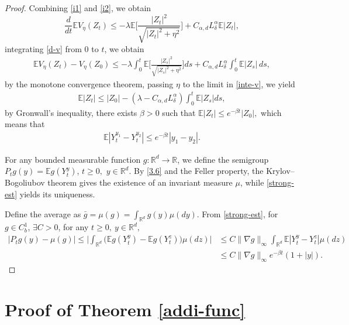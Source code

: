 \documentclass[11pt,reqno]{amsart}
\numberwithin{equation}{section}
\newcommand{\R}{\mathbb{R}}
\begin{document}
\begin{proof}
	
	Combining \eqref{i1} and \eqref{i2}, we obtain
	\begin{equation}\label{d-v}
		\frac{d}{dt}\mathbb E V_\eta(Z_t)
		\leq-\lambda \mathbb E\bigg[\frac{|Z_t|^2}{\sqrt{|Z_t|^2+\eta^2}}\bigg]
		+C_{\alpha,d}L_\delta^{\alpha}\mathbb E|Z_t|,
	\end{equation}
	integrating \eqref{d-v} from $0$ to $t$, we obtain
	\begin{align}\label{inte-v}
	\mathbb E V_\eta(Z_t)- V_\eta(Z_0)\leq-\lambda\int_0^t \mathbb E\bigg[\frac{|Z_s|^2}{\sqrt{|Z_s|^2+\eta^2}}\bigg]ds+
	C_{\alpha,d}L_\delta^{\alpha}\int_0^t\mathbb E|Z_s|\,ds,
	\end{align}
by the monotone convergence theorem, passing $\eta$ to the limit in \eqref{inte-v}, we yield
\begin{align*}
\mathbb E|Z_t|	\leq |Z_0|-\left(	\lambda-C_{\alpha,d}L_\delta^{\alpha}	\right)\int_{0}^{t}	\mathbb E|Z_s|ds,
\end{align*}
	by Gronwall's inequality, there exists $\beta>0$ such that
$
	\mathbb E|Z_t|\leq e^{-\beta t}|Z_0|,
$
	which means that
	\begin{align*}
	\mathbb E|Y_t^{y_1}-Y_t^{y_2}|\leq e^{-\beta t}|y_1-y_2|.
	\end{align*}

For any bounded measurable function $g:\mathbb{R}^{d}\rightarrow \mathbb{R}$,  we define the semigroup
$ P_{t}g(y)=\mathbb{E}g(Y_{t}^{ y})$,  $t\geq 0,$  $y\in \mathbb{R}^{d}.$ By \eqref{3.6} and the Feller property, the Krylov--Bogoliubov theorem
gives the existence of an invariant measure $\mu$, while
\eqref{strong-est} yields its uniqueness.

Define the average as
$
\bar{g}=\mu(g)=\int_{\R^{d}}g(y)\mu(dy).
$
	 From \eqref{strong-est}, for $g\in C^1_b$, $\exists C>0$,  for any $ t\geq0, \ y\in \mathbb R^{d},$
\begin{align*}
	\left| P_{t}g(y)-\mu(g)\right| %
	\leq \bigg|  \int_{\R^{d}}\big(\mathbb{E}g(Y^{y}_t)-\mathbb{E}g(Y^{z}_t) \big) \mu(dz)\bigg|&\leq C \|\nabla g\|_\infty\int_{\R^{d}}	\mathbb E|Y_t^{y}-Y_t^{z}| \mu(dz)\\
	& \leq C\|\nabla g\|_\infty e^{-\beta t}(1+|y|).
\end{align*}
\end{proof}





\section{Proof of Theorem \ref{addi-func}}\label{add}
\end{document}
